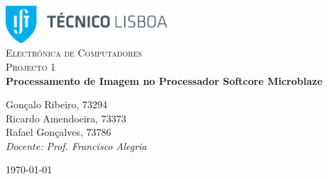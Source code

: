 \begin{titlepage}

	\begin{center}

		\includegraphics[width=6cm]{./title}\\[3cm]

		\textsc{\LARGE Electrónica de Computadores}\\[1.5cm]

		\textsc{\Large Projecto 1}\\[1.5cm]


		{ \huge \bfseries Processamento de Imagem no Processador Softcore Microblaze\\[2.5cm] }


		\noindent
		\begin{center} \large
			Gonçalo Ribeiro, 73294\\[5mm]

			Ricardo Amendoeira, 73373\\[5mm]

			Rafael Gonçalves, 73786\\[2.5cm]

			\textit{Docente: Prof. Francisco Alegria}

		\end{center}

		\vfill

		{\large \today}

	\end{center}

\end{titlepage}
